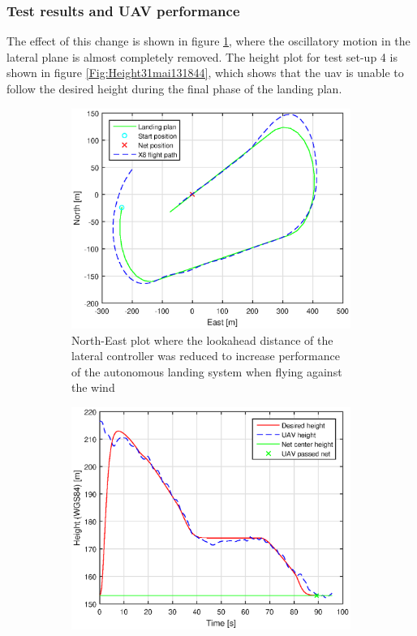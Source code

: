 \subsubsection{Test results and UAV performance}
The effect of this change is shown in figure \ref{Fig:NorthEast31mai131844}, where the oscillatory motion in the lateral plane is almost completely removed. The height plot for test set-up 4 is shown in figure \ref{Fig:Height31mai131844}, which shows that the \gls{uav} is unable to follow the desired height during the final phase of the landing plan.
\newpage
\begin{figure}[H]
\centering
\begin{subfigure}{0.7\textwidth}
		\includegraphics[width=\textwidth]{figs/Experiment/NorthEast31mai131844.eps}
\caption{North-East plot where the lookahead distance of the lateral controller was reduced to increase performance of the autonomous landing system when flying against the wind}
\label{Fig:NorthEast31mai131844}
\end{subfigure}
\begin{subfigure}{0.7\textwidth}
		\includegraphics[width=\textwidth]{figs/Experiment/Height31mai131844.eps}

\end{subfigure}
\end{figure}
